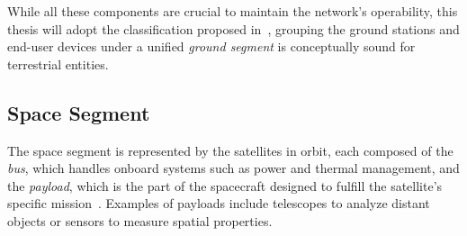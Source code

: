 \documentclass[11pt,a4paper]{report}
\begin{document}
While all these components are crucial to maintain the network's operability, this thesis will adopt the classification proposed in~\cite{aLotOfReferences}, 
grouping the ground stations and end-user devices under a unified \textit{ground segment} is conceptually sound for terrestrial entities. 

\subsection{Space Segment}
The space segment is represented by the satellites in orbit, each composed of the \textit{bus}, which handles onboard systems such as power and thermal management, 
and the \textit{payload}, which is the part of the spacecraft designed to fulfill the satellite's specific mission~\cite[p. 381--383]{aLotOfReferences}. 
Examples of payloads include telescopes to analyze distant objects or sensors to measure spatial properties.
\end{document}
